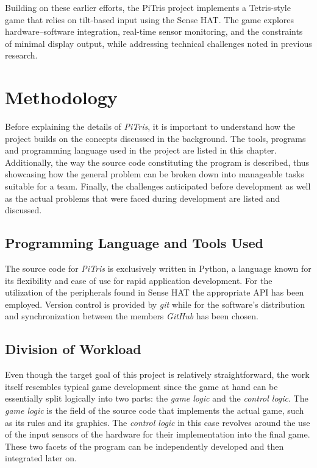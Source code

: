 \documentclass[12pt]{report}
\begin{document}
Building on these earlier efforts, the PiTris project implements a Tetris-style game that relies on tilt-based input using the Sense HAT. The game explores hardware–software integration, real-time sensor monitoring, and the constraints of minimal display output, while addressing technical challenges noted in previous research.



\chapter{Methodology}
Before explaining the details of \textit{PiTris}, it is important to understand how the project builds on the concepts discussed in the background. The tools, programs and programming language used in the project are listed in this chapter. Additionally, the way the source code constituting the program is described, thus showcasing how the general problem can be broken down into manageable tasks suitable for a team. Finally, the challenges anticipated before development as well as the actual problems that were faced during development are listed and discussed.

\section{Programming Language and Tools Used}
The source code for \textit{PiTris} is exclusively written in Python, a language known for its flexibility and ease of use for rapid application development. For the utilization of the peripherals found in Sense HAT the appropriate API has been employed. Version control is provided by \textit{git} while for the software's distribution and synchronization between the members \textit{GitHub} has been chosen.

\section{Division of Workload}
Even though the target goal of this project is relatively straightforward, the work itself resembles typical game development since the game at hand can be essentially split logically into two parts: the \textit{game logic} and the \textit{control logic}. The \textit{game logic} is the field of the source code that implements the actual game, such as its rules and its graphics. The \textit{control logic} in this case revolves around the use of the input sensors of the hardware for their implementation into the final game. These two facets of the program can be independently developed and then integrated later on.
\end{document}
